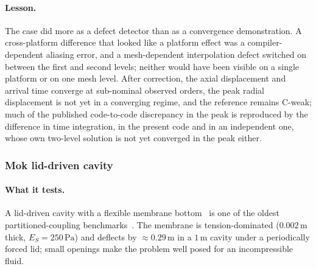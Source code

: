 \paragraph{Lesson.}
The case did more as a defect detector than as a convergence demonstration.
A cross-platform difference that looked like a platform effect was a compiler-dependent aliasing error, and a mesh-dependent interpolation defect switched on between the first and second levels; neither would have been visible on a single platform or on one mesh level.
After correction, the axial displacement and arrival time converge at sub-nominal observed orders, the peak radial displacement is not yet in a converging regime, and the reference remains C-weak; much of the published code-to-code discrepancy in the peak is reproduced by the difference in time integration, in the present code and in an independent one, whose own two-level solution is not yet converged in the peak either.

\subsubsection{Mok lid-driven cavity}\label{sec:mok}

\paragraph{What it tests.}
A lid-driven cavity with a flexible membrane bottom~\citep{Wall1999, Mok2001, MokWallRamm2001} is one of the oldest partitioned-coupling benchmarks~\citep{Gerbeau2003, kuttler2008fixed, Kassiotis2011}.
The membrane is tension-dominated ($0.002\,\mathrm{m}$ thick, $E_S = 250\,\mathrm{Pa}$) and deflects by $\approx0.29\,\mathrm{m}$ in a $1\,\mathrm{m}$ cavity under a periodically forced lid; small openings make the problem well posed for an incompressible fluid.

